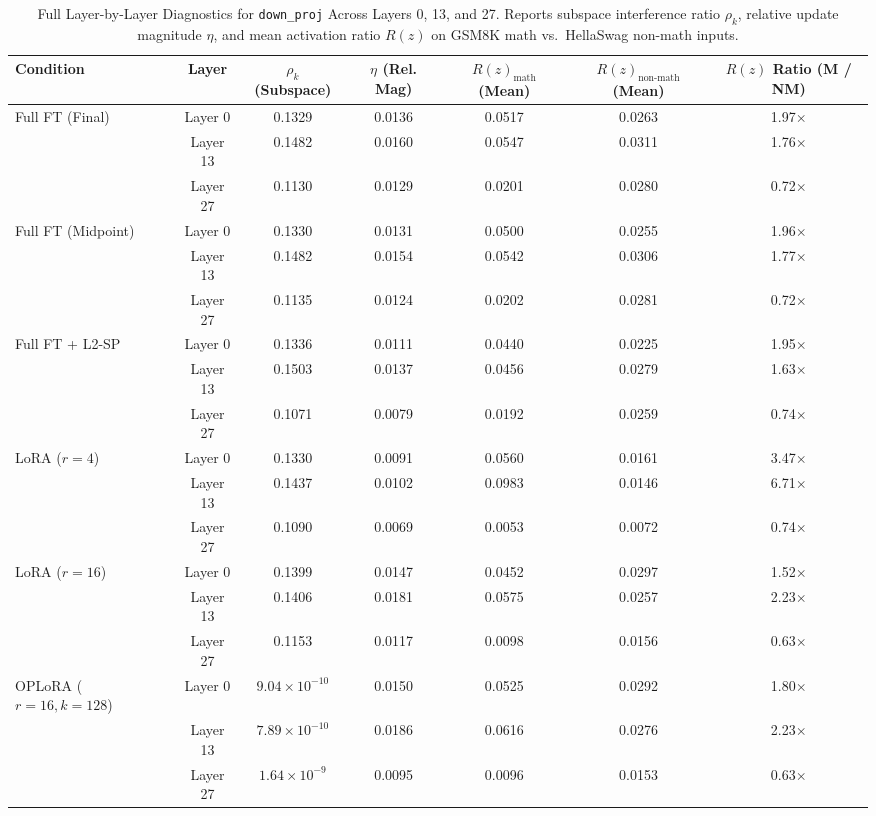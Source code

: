 \documentclass{article}
\begin{document}
\begin{table}[htbp]
    \centering
    \caption{Full Layer-by-Layer Diagnostics for \texttt{down\_proj} Across Layers 0, 13, and 27. Reports subspace interference ratio $\rho_k$, relative update magnitude $\eta$, and mean activation ratio $R(z)$ on GSM8K math vs.\ HellaSwag non-math inputs.}
    \label{tab:app_t1_layer_diagnostics}
    \small
    \begin{tabular}{lcccccc}
        \toprule
        Condition & Layer & $\rho_k$ (Subspace) & $\eta$ (Rel. Mag) & $R(z)_{\text{math}}$ (Mean) & $R(z)_{\text{non-math}}$ (Mean) & $R(z)$ Ratio (M / NM) \\
        \midrule
        Full FT (Final) & Layer 0 & 0.1329 & 0.0136 & 0.0517 & 0.0263 & 1.97$\times$ \\
        & Layer 13 & 0.1482 & 0.0160 & 0.0547 & 0.0311 & 1.76$\times$ \\
        & Layer 27 & 0.1130 & 0.0129 & 0.0201 & 0.0280 & 0.72$\times$ \\
        \midrule
        Full FT (Midpoint) & Layer 0 & 0.1330 & 0.0131 & 0.0500 & 0.0255 & 1.96$\times$ \\
        & Layer 13 & 0.1482 & 0.0154 & 0.0542 & 0.0306 & 1.77$\times$ \\
        & Layer 27 & 0.1135 & 0.0124 & 0.0202 & 0.0281 & 0.72$\times$ \\
        \midrule
        Full FT + L2-SP & Layer 0 & 0.1336 & 0.0111 & 0.0440 & 0.0225 & 1.95$\times$ \\
        & Layer 13 & 0.1503 & 0.0137 & 0.0456 & 0.0279 & 1.63$\times$ \\
        & Layer 27 & 0.1071 & 0.0079 & 0.0192 & 0.0259 & 0.74$\times$ \\
        \midrule
        LoRA ($r=4$) & Layer 0 & 0.1330 & 0.0091 & 0.0560 & 0.0161 & 3.47$\times$ \\
        & Layer 13 & 0.1437 & 0.0102 & 0.0983 & 0.0146 & 6.71$\times$ \\
        & Layer 27 & 0.1090 & 0.0069 & 0.0053 & 0.0072 & 0.74$\times$ \\
        \midrule
        LoRA ($r=16$) & Layer 0 & 0.1399 & 0.0147 & 0.0452 & 0.0297 & 1.52$\times$ \\
        & Layer 13 & 0.1406 & 0.0181 & 0.0575 & 0.0257 & 2.23$\times$ \\
        & Layer 27 & 0.1153 & 0.0117 & 0.0098 & 0.0156 & 0.63$\times$ \\
        \midrule
        OPLoRA ($r=16, k=128$) & Layer 0 & $9.04\times 10^{-10}$ & 0.0150 & 0.0525 & 0.0292 & 1.80$\times$ \\
        & Layer 13 & $7.89\times 10^{-10}$ & 0.0186 & 0.0616 & 0.0276 & 2.23$\times$ \\
        & Layer 27 & $1.64\times 10^{-9}$ & 0.0095 & 0.0096 & 0.0153 & 0.63$\times$ \\
        \bottomrule
    \end{tabular}
\end{table}
\end{document}
